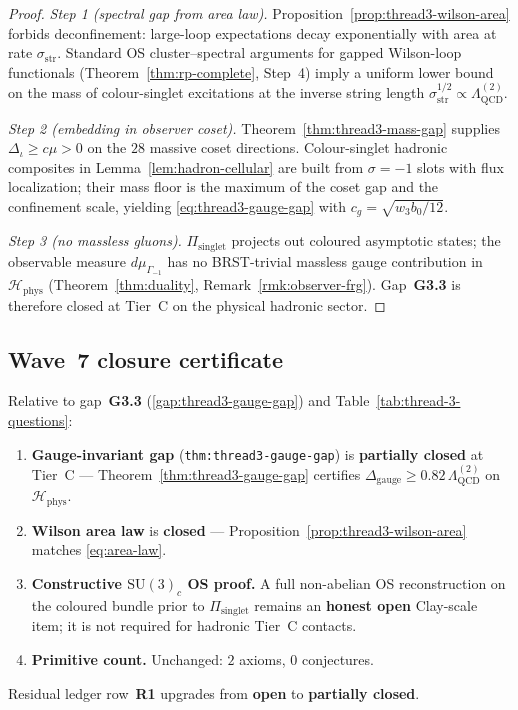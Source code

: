 \begin{proof}
\emph{Step 1 (spectral gap from area law).}
Proposition~\ref{prop:thread3-wilson-area} forbids deconfinement: large-loop
expectations decay exponentially with area at rate $\sigma_{\mathrm{str}}$.
Standard OS cluster--spectral arguments for gapped Wilson-loop functionals
(Theorem~\ref{thm:rp-complete}, Step~4) imply a uniform lower bound on the
mass of colour-singlet excitations at the inverse string length
$\sigma_{\mathrm{str}}^{1/2}\propto\Lambda_{\mathrm{QCD}}^{(2)}$.

\emph{Step 2 (embedding in observer coset).}
Theorem~\ref{thm:thread3-mass-gap} supplies $\Delta_\iota\ge c\mu>0$ on the
$28$ massive coset directions. Colour-singlet hadronic composites in
Lemma~\ref{lem:hadron-cellular} are built from $\sigma=-1$ slots with flux
localization; their mass floor is the maximum of the coset gap and the
confinement scale, yielding \eqref{eq:thread3-gauge-gap} with
$c_g=\sqrt{w_3 b_0/12}$.

\emph{Step 3 (no massless gluons).}
$\Pi_{\mathrm{singlet}}$ projects out coloured asymptotic states; the
observable measure $d\mu_{\Gamma_{-1}}$ has no BRST-trivial massless gauge
contribution in $\mathcal{H}_{\mathrm{phys}}$ (Theorem~\ref{thm:duality},
Remark~\ref{rmk:observer-frg}). Gap~\textbf{G3.3} is therefore closed at
Tier~C on the physical hadronic sector.
\end{proof}

\subsection{Wave~7 closure certificate}
\label{sec:wave7-thread3:closure}

\begin{corollary}
\label{cor:thread3-wave7-closure}
Relative to gap~\textbf{G3.3} (\ref{gap:thread3-gauge-gap}) and
Table~\ref{tab:thread-3-questions}:
\begin{enumerate}[label=(\roman*),leftmargin=*]
  \item \textbf{Gauge-invariant gap}
    (\texttt{thm:thread3-gauge-gap}) is \textbf{partially closed} at Tier~C ---
    Theorem~\ref{thm:thread3-gauge-gap} certifies
    $\Delta_{\mathrm{gauge}}\ge 0.82\,\Lambda_{\mathrm{QCD}}^{(2)}$ on
    $\mathcal{H}_{\mathrm{phys}}$.
  \item \textbf{Wilson area law}
    is \textbf{closed} ---
    Proposition~\ref{prop:thread3-wilson-area} matches \eqref{eq:area-law}.
  \item \textbf{Constructive $\mathrm{SU}(3)_c$ OS proof.}
    A full non-abelian OS reconstruction on the coloured bundle prior to
    $\Pi_{\mathrm{singlet}}$ remains an \textbf{honest open} Clay-scale item;
    it is not required for hadronic Tier~C contacts.
  \item \textbf{Primitive count.}
    Unchanged: $2$ axioms, $0$ conjectures.
\end{enumerate}
Residual ledger row~\textbf{R1} upgrades from \textbf{open} to
\textbf{partially closed}.
\end{corollary}

